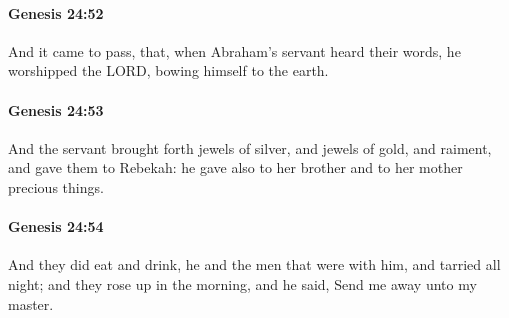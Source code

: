		\paragraph{Genesis 24:52} %
			\label{GENESIS-24-52}

			And it came to pass, that, when Abraham's servant heard their words, he worshipped the LORD, bowing himself to the earth.


		\paragraph{Genesis 24:53} %
			\label{GENESIS-24-53}

			And the servant brought forth jewels of silver, and jewels of gold, and raiment, and gave them to Rebekah: he gave also to her brother and to her mother precious things.


		\paragraph{Genesis 24:54} %
			\label{GENESIS-24-54}

			And they did eat and drink, he and the men that were with him, and tarried all night; and they rose up in the morning, and he said, Send me away unto my master.



